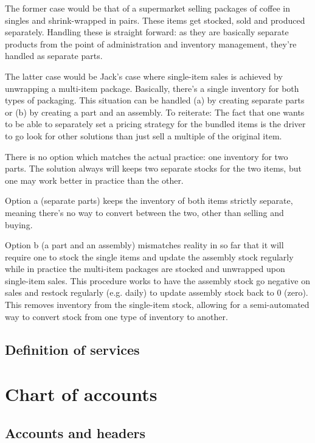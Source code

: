 The former case would be that of a supermarket selling packages of coffee in
singles and shrink-wrapped in pairs. These items get stocked, sold and produced separately.
Handling these is straight forward: as they are basically separate products from the point
of administration and inventory management, they're handled as separate parts.

The latter case would be Jack's case where single-item sales is achieved by unwrapping
a multi-item package. Basically, there's a single inventory for both types of packaging.
This situation can be handled (a) by creating separate parts or (b) by creating a part and an
assembly.
To reiterate: The fact that one wants to be able to separately set a pricing strategy
for the bundled items is the driver to go look for other solutions than just sell a
multiple of the original item.

There is no option which matches the actual practice: one inventory for two parts. The solution
always will keeps two separate stocks for the two items, but one may work better in practice
than the other.

Option a (separate parts) keeps the inventory of both items strictly separate,
meaning there's no way to convert between the two, other than selling and buying.

Option b (a part and an assembly) mismatches reality in so far that it will require one
to stock the single items and update the assembly stock regularly while in practice the
multi-item packages are stocked and unwrapped upon single-item sales. This procedure works
to have the assembly stock go negative on sales and restock regularly (e.g. daily) to
update assembly stock back to 0 (zero). This removes inventory from the single-item stock,
allowing for a semi-automated way to convert stock from one type of inventory to another.


\section{Definition of services}

\chapter{Chart of accounts}
\label{cha:chart-of-accounts}

\section{Accounts and headers}

